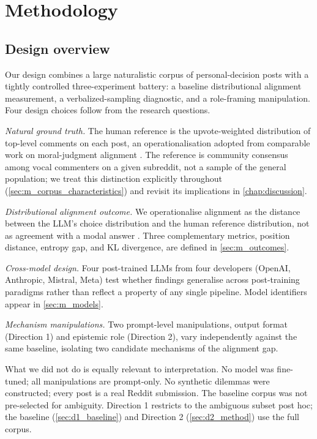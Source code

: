 \chapter{Methodology}
\label{chap:methodology}

\section{Design overview}
\label{sec:m_design}

Our design combines a large naturalistic corpus of personal-decision
posts with a tightly controlled three-experiment battery: a baseline
distributional alignment measurement, a verbalized-sampling diagnostic,
and a role-framing manipulation. Four design choices follow from the
research questions.

\textit{Natural ground truth.} The human reference is the upvote-weighted
distribution of top-level comments on each post, an operationalisation
adopted from comparable work on moral-judgment alignment
\citep{sachdeva-2025-aita}. The reference is community consensus among
vocal commenters on a given subreddit, not a sample of the general
population; we treat this distinction explicitly throughout
(\cref{sec:m_corpus_characteristics}) and revisit its implications in
\cref{chap:discussion}.

\textit{Distributional alignment outcome.} We operationalise alignment
as the distance between the LLM's choice distribution and the human
reference distribution, not as agreement with a modal answer
\citep{russo-2026-pluralistic}. Three complementary metrics,
position distance, entropy gap, and KL divergence, are defined in
\cref{sec:m_outcomes}.

\textit{Cross-model design.} Four post-trained LLMs from four
developers (OpenAI, Anthropic, Mistral, Meta) test whether findings
generalise across post-training paradigms rather than reflect a
property of any single pipeline. Model identifiers appear in
\cref{sec:m_models}.

\textit{Mechanism manipulations.} Two prompt-level manipulations,
output format (Direction 1) and epistemic role (Direction 2), vary
independently against the same baseline, isolating two candidate
mechanisms of the alignment gap.

What we did not do is equally relevant to interpretation. No model was
fine-tuned; all manipulations are prompt-only. No synthetic dilemmas
were constructed; every post is a real Reddit submission. The baseline
corpus was not pre-selected for ambiguity. Direction 1 restricts to
the ambiguous subset post hoc; the baseline (\cref{sec:d1_baseline})
and Direction 2 (\cref{sec:d2_method}) use the full corpus.

